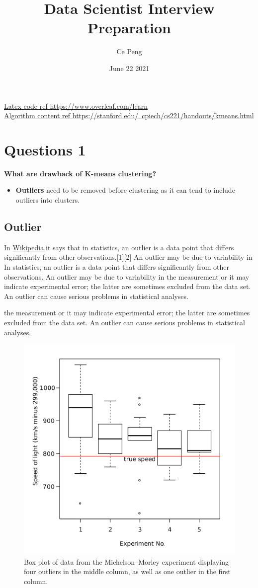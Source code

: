 \documentclass[10pt,letterpaper]{article}
\title{\textbf{Data Scientist Interview Preparation}}
\author{Ce Peng}
\date{June 22 2021}
\begin{document}
\begin{titlepage}
\maketitle\maketitle
\begin{flushleft}
\href{https://www.overleaf.com/learn}{Latex code ref https://www.overleaf.com/learn} \\
\href{https://stanford.edu/~cpiech/cs221/handouts/kmeans.html}{Algorithm content ref https://stanford.edu/~cpiech/cs221/handouts/kmeans.html}
\end{flushleft}
\end{titlepage}

\section{Questions 1}
\textbf{What are drawback of K-means clustering?}
\begin{itemize}
\item \textbf{Outliers} need to be removed before clustering as it can tend to include outliers into clusters.
\end{itemize}

\subsection{Outlier}

In \href{https://en.wikipedia.org/wiki/Outlier#Identifying_outliers}{Wikipedia},it says that in statistics, an outlier is a data point that differs significantly from other observations.[1][2] An outlier may be due to variability in In statistics, an outlier is a data point that differs significantly from other observations. An outlier may be due to variability in the measurement or it may indicate experimental error; the latter are sometimes excluded from the data set. An outlier can cause serious problems in statistical analyses.

the measurement or it may indicate experimental error; the latter are sometimes excluded from the data set. An outlier can cause serious problems in statistical analyses.

\begin{figure}[H]
\includegraphics[width=.3\textwidth]{2560px-Michelsonmorley-boxplot.svg.png}
\centering
\caption{ Box plot of data from the Michelson–Morley experiment displaying four outliers in the middle column, as well as one outlier in the first column.}
\label{figure4}
\end{figure}
\end{document}
